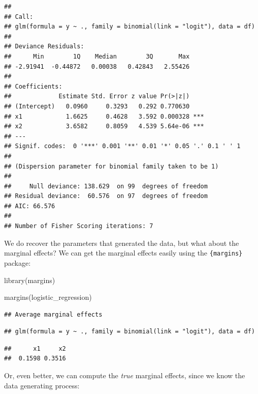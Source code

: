 \documentclass[
]{article}
\newenvironment{Shaded}{\begin{snugshade}}{\end{snugshade}}
\newcommand{\FunctionTok}[1]{\textcolor[rgb]{0.00,0.00,0.00}{#1}}
\newcommand{\NormalTok}[1]{#1}
\begin{document}
\begin{verbatim}
## 
## Call:
## glm(formula = y ~ ., family = binomial(link = "logit"), data = df)
## 
## Deviance Residuals: 
##      Min        1Q    Median        3Q       Max  
## -2.91941  -0.44872   0.00038   0.42843   2.55426  
## 
## Coefficients:
##             Estimate Std. Error z value Pr(>|z|)    
## (Intercept)   0.0960     0.3293   0.292 0.770630    
## x1            1.6625     0.4628   3.592 0.000328 ***
## x2            3.6582     0.8059   4.539 5.64e-06 ***
## ---
## Signif. codes:  0 '***' 0.001 '**' 0.01 '*' 0.05 '.' 0.1 ' ' 1
## 
## (Dispersion parameter for binomial family taken to be 1)
## 
##     Null deviance: 138.629  on 99  degrees of freedom
## Residual deviance:  60.576  on 97  degrees of freedom
## AIC: 66.576
## 
## Number of Fisher Scoring iterations: 7
\end{verbatim}

We do recover the parameters that generated the data, but what about the marginal effects? We can
get the marginal effects easily using the \texttt{\{margins\}} package:

\begin{Shaded}
\begin{Highlighting}[]
\FunctionTok{library}\NormalTok{(margins)}

\FunctionTok{margins}\NormalTok{(logistic\_regression)}
\end{Highlighting}
\end{Shaded}

\begin{verbatim}
## Average marginal effects
\end{verbatim}

\begin{verbatim}
## glm(formula = y ~ ., family = binomial(link = "logit"), data = df)
\end{verbatim}

\begin{verbatim}
##      x1     x2
##  0.1598 0.3516
\end{verbatim}

Or, even better, we can compute the \emph{true} marginal effects, since we know the data
generating process:
\end{document}
